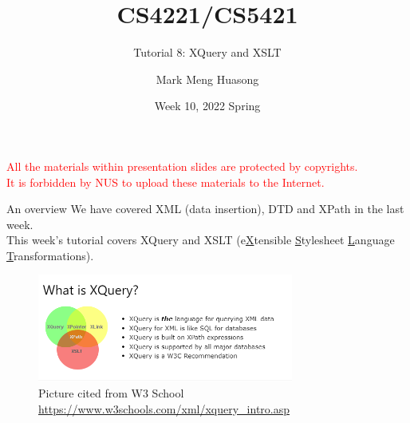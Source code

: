 \title{CS4221/CS5421}

\subtitle{Tutorial 8: XQuery and XSLT}

\author{Mark Meng Huasong}



\date{Week 10, 2022 Spring}


\begin{frame}
	\titlepage
	\begin{tcolorbox}
		\begin{center}
			{\scriptsize \textcolor{red}{All the materials within presentation slides are protected by copyrights.\\
					It is forbidden by NUS to upload these materials to the Internet.}}
		\end{center}
	\end{tcolorbox}
\end{frame}

\begin{frame}[fragile]{An overview}
We have covered XML (data insertion), DTD and XPath in the last week.\\\vspace{10pt}
This week's tutorial covers XQuery and XSLT (e\underline{X}tensible \underline{S}tylesheet \underline{L}anguage \underline{T}ransformations).\\\vspace{10pt}
\begin{figure}
	\includegraphics[width=0.75\textwidth,frame]{4221-t8/what.png}
	\caption{Picture cited from W3 School  \url{https://www.w3schools.com/xml/xquery_intro.asp}}
\end{figure}\vspace{-10pt}
\end{frame}

